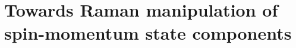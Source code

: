 
\chapter{Towards Raman manipulation of spin-momentum state components}
\label{chap:raman_manipulation}



